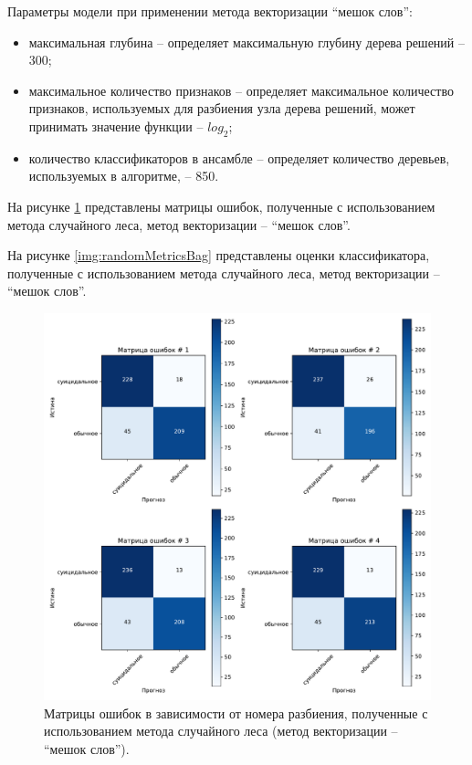 Параметры модели при применении метода векторизации ``мешок слов'':
\begin{itemize}
	\item максимальная глубина -- определяет максимальную глубину дерева решений -- 300;
	\item максимальное количество признаков -- определяет максимальное количество признаков, используемых для разбиения узла дерева решений, может принимать значение функции -- $log_2$;
	\item количество классификаторов в ансамбле -- определяет количество деревьев, используемых в алгоритме, -- 850.
\end{itemize}

На рисунке \ref{img:randomMatrBag} представлены матрицы ошибок, полученные с использованием метода случайного леса, метод векторизации -- ``мешок слов''.

На рисунке \ref{img:randomMetricsBag} представлены оценки классификатора, полученные с использованием метода случайного леса, метод векторизации -- ``мешок слов''.

\begin{figure}[H]
	\centering
	\includegraphics[width=\textwidth]{inc/plots/randomMatrBag.pdf}
	\caption{ Матрицы ошибок в зависимости от номера разбиения, полученные с использованием метода случайного леса (метод векторизации -- ``мешок слов''). }
	\label{img:randomMatrBag}
\end{figure}

